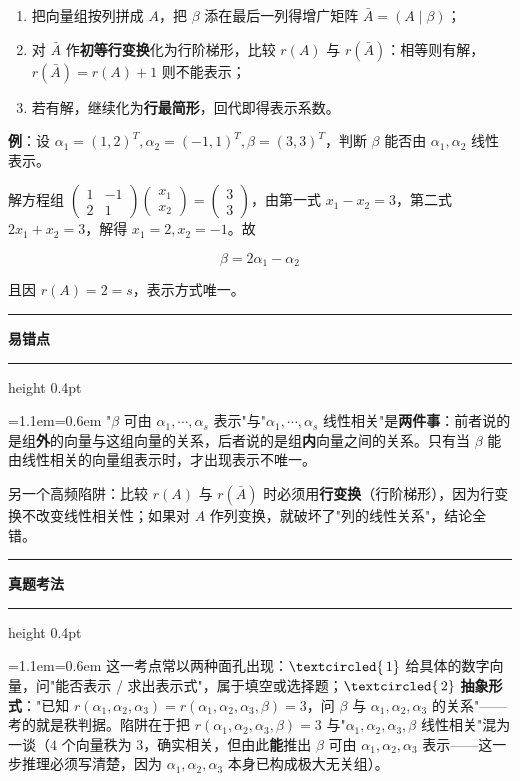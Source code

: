 \documentclass[11pt,openany,UTF8]{ctexbook}
\newcommand{\circled}[1]{\textcircled{\scriptsize\,#1}}
\newcommand{\callouthead}[2]{%
  \par\addvspace{7pt}\noindent
  {\color{#1}\rule[-0.15em]{3pt}{1.05em}}\hspace{0.5em}%
  {\bfseries\color{#1}#2}\par\nobreak\vspace{-0.35em}%
  {\color{rulesep}\hrule height 0.4pt}\nobreak\vspace{0.45em}%
  \begingroup\small\setlength{\parindent}{0pt}%
  \leftskip=1.1em\rightskip=0.6em\noindent\ignorespaces}
\newcommand{\calloutend}{\par\endgroup\addvspace{7pt}}
\newenvironment{callwarn}[1]{\callouthead{warnbar}{#1}}{\calloutend}
\newenvironment{callexam}[1]{\callouthead{exambar}{#1}}{\calloutend}
\begin{document}
\begin{enumerate}
\item 把向量组按列拼成 $A$，把 $\beta$ 添在最后一列得增广矩阵 $\bar A=(A\mid\beta)$；
\item 对 $\bar A$ 作\textbf{初等行变换}化为行阶梯形，比较 $r(A)$ 与 $r(\bar A)$：相等则有解，$r(\bar A)=r(A)+1$ 则不能表示；
\item 若有解，继续化为\textbf{行最简形}，回代即得表示系数。
\end{enumerate}
\textbf{例}：设 $\alpha_1=(1,2)^T,\alpha_2=(-1,1)^T,\beta=(3,3)^T$，判断 $\beta$ 能否由 $\alpha_1,\alpha_2$ 线性表示。

解方程组 $\begin{pmatrix} 1 & -1 \\ 2 & 1 \end{pmatrix}\begin{pmatrix} x_1 \\ x_2 \end{pmatrix}=\begin{pmatrix} 3 \\ 3 \end{pmatrix}$，由第一式 $x_1-x_2=3$，第二式 $2x_1+x_2=3$，解得 $x_1=2,x_2=-1$。故

\[\beta=2\alpha_1-\alpha_2\]

且因 $r(A)=2=s$，表示方式唯一。

\begin{callwarn}{易错点}
"$\beta$ 可由 $\alpha_1,\cdots,\alpha_s$ 表示"与"$\alpha_1,\cdots,\alpha_s$ 线性相关"是\textbf{两件事}：前者说的是组\textbf{外}的向量与这组向量的关系，后者说的是组\textbf{内}向量之间的关系。只有当 $\beta$ 能由线性相关的向量组表示时，才出现表示不唯一。

另一个高频陷阱：比较 $r(A)$ 与 $r(\bar A)$ 时必须用\textbf{行变换}（行阶梯形），因为行变换不改变线性相关性；如果对 $A$ 作列变换，就破坏了"列的线性关系"，结论全错。

\end{callwarn}

\begin{callexam}{真题考法}
这一考点常以两种面孔出现：$\circled{1}$ 给具体的数字向量，问"能否表示 / 求出表示式"，属于填空或选择题；$\circled{2}$ \textbf{抽象形式}："已知 $r(\alpha_1,\alpha_2,\alpha_3)=r(\alpha_1,\alpha_2,\alpha_3,\beta)=3$，问 $\beta$ 与 $\alpha_1,\alpha_2,\alpha_3$ 的关系"——考的就是秩判据。陷阱在于把 $r(\alpha_1,\alpha_2,\alpha_3,\beta)=3$ 与"$\alpha_1,\alpha_2,\alpha_3,\beta$ 线性相关"混为一谈（$4$ 个向量秩为 $3$，确实相关，但由此\textbf{能}推出 $\beta$ 可由 $\alpha_1,\alpha_2,\alpha_3$ 表示——这一步推理必须写清楚，因为 $\alpha_1,\alpha_2,\alpha_3$ 本身已构成极大无关组）。

\end{callexam}
\end{document}
